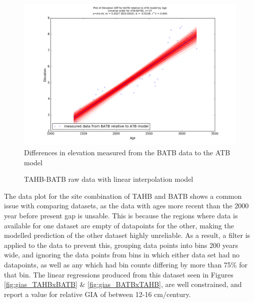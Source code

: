 \begin{figure}[h]
	\includegraphics[width=0.9\linewidth]{data/bothNonZero/withinSeventyFivePercent/gias/theGIA_BATB_relative_to_ATB.png}
	\caption{Differences in elevation measured from the BATB data to the ATB model}
	\label{fig:gias_BATBxATB}
\end{figure}
\newpage



\begin{figure}[h]
	\caption{TAHB-BATB raw data with linear interpolation model}
	\label{fig:data_TAHBxBATB}
\end{figure}

The data plot for the site combination of TAHB and BATB shows a common issue
with comparing datasets, as the data with ages more recent than the 2000 year before
present gap is unsable. This is because the regions where data is available for
one dataset are empty of datapoints for the other, making the modelled prediction
of the other dataset highly unreliable. As a result, a filter is applied to the
data to prevent this, grouping data points into bins 200 years wide, and
ignoring the data points from bins in which either data set had no datapoints,
as well as any which had bin counts differing by more than 75\% for that bin.
The linear regressions produced from this dataset seen in Figures 
\ref{fig:gias_TAHBxBATB} \& \ref{fig:gias_BATBxTAHB}, are well constrained, and
report a value for relative GIA of between 12-16 cm/century.


